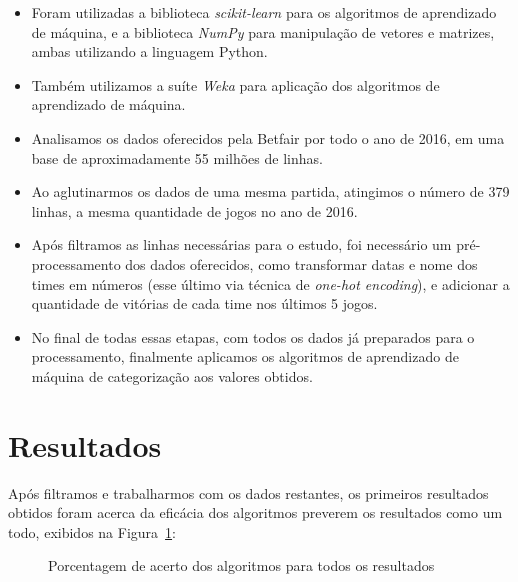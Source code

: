 \documentclass[thesis]{hmcposter}
\begin{document}
\begin{poster}
\begin{itemize}
\item Foram utilizadas a biblioteca \emph{scikit-learn} para os algoritmos de aprendizado de máquina, e a biblioteca \emph{NumPy} para manipulação de vetores e matrizes, ambas utilizando a linguagem Python.
\item Também utilizamos a suíte \emph{Weka} para aplicação dos algoritmos de aprendizado de máquina.
\item Analisamos os dados oferecidos pela Betfair por todo o ano de 2016, em uma base de aproximadamente 55 milhões de linhas.
\item Ao aglutinarmos os dados de uma mesma partida, atingimos o número de 379 linhas, a mesma quantidade de jogos no ano de 2016.
\item Após filtramos as linhas necessárias para o estudo, foi necessário um pré-processamento dos dados oferecidos, como transformar datas e nome dos times em números (esse último via técnica de \emph{one-hot encoding}), e adicionar a quantidade de vitórias de cada time nos últimos 5 jogos.
\item No final de todas essas etapas, com todos os dados já preparados para o processamento, finalmente aplicamos os algoritmos de aprendizado de máquina de categorização aos valores obtidos.
\end{itemize}

\section{Resultados}%

Após filtramos e trabalharmos com os dados restantes, os primeiros resultados obtidos foram acerca da eficácia dos algoritmos preverem os resultados como um todo, exibidos na Figura~\ref{fig:total-algoritmo}:

\begin{figure}
\begin{center}
\caption{Porcentagem de acerto dos algoritmos para todos os resultados}%
\label{fig:total-algoritmo}
\end{center}
\end{figure}


\end{poster}
\end{document}
